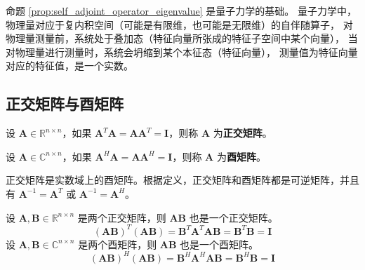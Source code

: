 \begin{note}
    命题 \ref{prop:self_adjoint_operator_eigenvalue} 是量子力学的基础。
    量子力学中，物理量对应于复内积空间（可能是有限维，也可能是无限维）的自伴随算子，
    对物理量测量前，系统处于叠加态（特征向量所张成的特征子空间中某个向量），
    当对物理量进行测量时，系统会坍缩到某个本征态（特征向量），
    测量值为特征向量对应的特征值，是一个实数。
\end{note}

\vspace{1em}
\subsection{正交矩阵与酉矩阵}

\begin{definition}
    设 $\mathbf{A} \in \mathbb{R}^{n \times n}$，如果 $\mathbf{A}^T \mathbf{A} = \mathbf{A} \mathbf{A}^T = \mathbf{I}$，则称 $\mathbf{A}$ 为\textbf{正交矩阵}。
    \label{def:orthogonal_matrix}
\end{definition}

\begin{definition}
    设 $\mathbf{A} \in \mathbb{C}^{n \times n}$，如果 $\mathbf{A}^H \mathbf{A} = \mathbf{A} \mathbf{A}^H = \mathbf{I}$，则称 $\mathbf{A}$ 为\textbf{酉矩阵}。
    \label{def:unitary_matrix}
\end{definition}

\begin{note}
    正交矩阵是实数域上的酉矩阵。根据定义，正交矩阵和酉矩阵都是可逆矩阵，并且有 $\mathbf{A}^{-1} = \mathbf{A}^T$ 或 $\mathbf{A}^{-1} = \mathbf{A}^H$。
\end{note}

\vspace{1em}

\begin{proposition}[正交（酉）矩阵的乘积依然是正交（酉）矩阵]
    设 $\mathbf{A},\mathbf{B} \in \mathbb{R}^{n \times n}$ 是两个正交矩阵，则 $\mathbf{A}\mathbf{B}$ 也是一个正交矩阵。
    \[
        (\mathbf{A}\mathbf{B})^T (\mathbf{A}\mathbf{B}) = \mathbf{B}^T \mathbf{A}^T \mathbf{A}\mathbf{B} = \mathbf{B}^T \mathbf{B} = \mathbf{I}
    \]    
    设 $\mathbf{A},\mathbf{B} \in \mathbb{C}^{n \times n}$ 是两个酉矩阵，则 $\mathbf{A}\mathbf{B}$ 也是一个酉矩阵。
    \[
        (\mathbf{A}\mathbf{B})^H (\mathbf{A}\mathbf{B}) = \mathbf{B}^H \mathbf{A}^H \mathbf{A}\mathbf{B} = \mathbf{B}^H \mathbf{B} = \mathbf{I}
    \]
\end{proposition}

